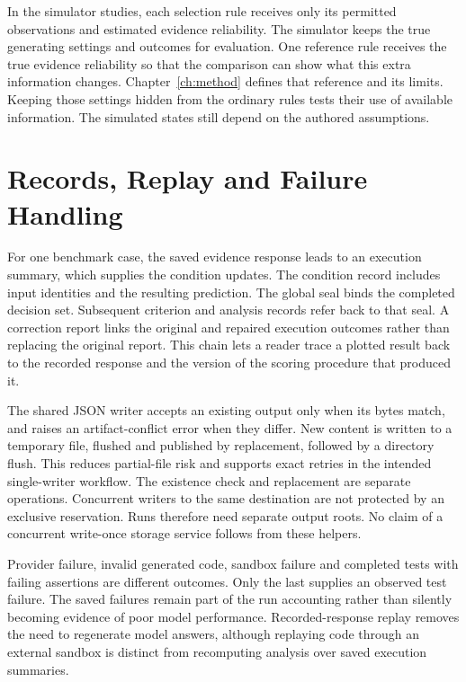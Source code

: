 In the simulator studies, each selection rule receives only its permitted observations and estimated evidence reliability.
The simulator keeps the true generating settings and outcomes for evaluation. One reference rule receives the true evidence
reliability so that the comparison can show what this extra information changes. Chapter~\ref{ch:method} defines that reference
and its limits. Keeping those settings hidden from the ordinary rules tests their use of available information. The simulated
states still depend on the authored assumptions.

\section{Records, Replay and Failure Handling}

For one benchmark case, the saved evidence response leads to an execution summary, which supplies the condition updates.
The condition record includes input identities and the resulting prediction. The global seal binds the completed decision
set. Subsequent criterion and analysis records refer back to that seal. A correction report links the original and repaired
execution outcomes rather than replacing the original report. This chain lets a reader trace a plotted result back to the
recorded response and the version of the scoring procedure that produced it.

The shared JSON writer accepts an existing output only when its bytes match, and raises an artifact-conflict error when they
differ. New content is written to a temporary file, flushed and published by replacement, followed by a directory flush.
This reduces partial-file risk and supports exact retries in the intended single-writer workflow. The existence check and
replacement are separate operations. Concurrent writers to the same destination are not protected by an exclusive reservation.
Runs therefore need separate output roots. No claim of a concurrent write-once storage service follows from these helpers.

Provider failure, invalid generated code, sandbox failure and completed tests with failing assertions are different outcomes.
Only the last supplies an observed test failure. The saved failures remain part of the run accounting rather than silently
becoming evidence of poor model performance. Recorded-response replay removes the need to regenerate model answers, although
replaying code through an external sandbox is distinct from recomputing analysis over saved execution summaries.

